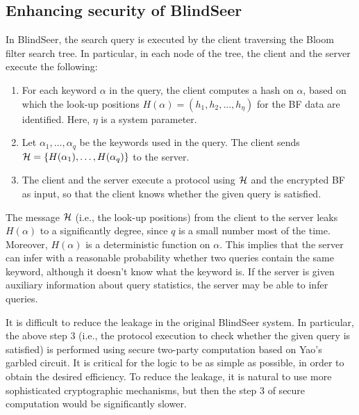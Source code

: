 
\def\HHH{{\cal H}}
\subsection{Enhancing security of BlindSeer}

In BlindSeer, the search query is executed by the client traversing the Bloom filter
search tree. In particular, in each node of the tree, the client and the server
execute the following:

\begin{enumerate}\setlength\itemsep{0em}
\item For each keyword $\alpha$ in the query, the client computes a hash on
$\alpha$, based on which the look-up positions $H(\alpha) =  (h_1, h_2, ...,
h_\eta)$ for the BF data are identified. Here, $\eta$ is a system
parameter. 

\item Let $\alpha_1, \ldots, \alpha_q$ be the keywords used in the query.  The
  client sends $\HHH = \{H(\alpha_1), \ldots, H(\alpha_q)\}$ to the server. 

\item The client and the server execute a protocol using $\HHH$ and the
encrypted BF as input, so that the client knows whether the given query is
satisfied. 
\end{enumerate}

The message $\HHH$ (i.e., the look-up positions) from the client to the server
leaks $H(\alpha)$ to a significantly degree, since $q$ is a small number most
of the time. Moreover, $H(\alpha)$ is a deterministic function on $\alpha$.
This implies that the server can infer with a reasonable probability whether
two queries contain the same keyword, although it doesn't know what the keyword
is.  If the server is given  auxiliary information about query statistics, the
server may be able to infer queries. 


It is difficult to reduce the leakage in the original
BlindSeer system. In particular, the above step 3 (i.e., the protocol execution
to check whether the given query is satisfied) is performed using secure
two-party computation based on Yao's garbled circuit. It is critical
for the logic to be as simple as possible, in order to obtain the desired
efficiency. To reduce the leakage, it is natural to use more sophisticated
cryptographic mechanisms, but then the step 3 of secure computation would be
significantly slower. 

